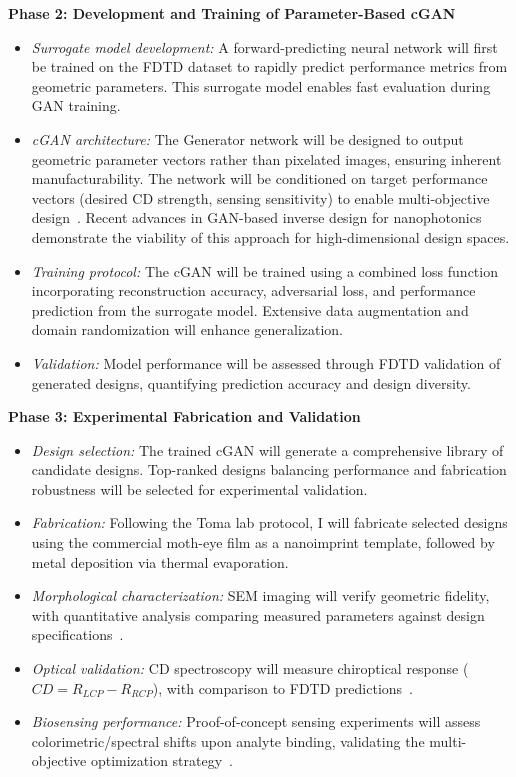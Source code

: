 \documentclass[12pt,a4paper]{article}
\begin{document}
\textbf{Phase 2: Development and Training of Parameter-Based cGAN}

\begin{itemize}
  \item \textit{Surrogate model development:} A forward-predicting neural network will first be trained on the FDTD dataset to rapidly predict performance metrics from geometric parameters. This surrogate model enables fast evaluation during GAN training.
  \item \textit{cGAN architecture:} The Generator network will be designed to output geometric parameter vectors rather than pixelated images, ensuring inherent manufacturability. The network will be conditioned on target performance vectors (desired CD strength, sensing sensitivity) to enable multi-objective design~\cite{benchmark_dl_inverse,conditional_gan_nanophotonics}. Recent advances in GAN-based inverse design for nanophotonics~\cite{rgan_metasurface,gan_nanophotonic_inverse,generative_metasurface_umbc} demonstrate the viability of this approach for high-dimensional design spaces.
  \item \textit{Training protocol:} The cGAN will be trained using a combined loss function incorporating reconstruction accuracy, adversarial loss, and performance prediction from the surrogate model. Extensive data augmentation and domain randomization will enhance generalization.
  \item \textit{Validation:} Model performance will be assessed through FDTD validation of generated designs, quantifying prediction accuracy and design diversity.
\end{itemize}

\textbf{Phase 3: Experimental Fabrication and Validation}

\begin{itemize}
  \item \textit{Design selection:} The trained cGAN will generate a comprehensive library of candidate designs. Top-ranked designs balancing performance and fabrication robustness will be selected for experimental validation.
  \item \textit{Fabrication:} Following the Toma lab protocol, I will fabricate selected designs using the commercial moth-eye film as a nanoimprint template, followed by metal deposition via thermal evaporation.
  \item \textit{Morphological characterization:} SEM imaging will verify geometric fidelity, with quantitative analysis comparing measured parameters against design specifications~\cite{cv_zheng}.
  \item \textit{Optical validation:} CD spectroscopy will measure chiroptical response ($CD = R_{LCP} - R_{RCP}$), with comparison to FDTD predictions~\cite{chiral_metasurface_holography}.
  \item \textit{Biosensing performance:} Proof-of-concept sensing experiments will assess colorimetric/spectral shifts upon analyte binding, validating the multi-objective optimization strategy~\cite{dl_nanophotonics_rg}.
\end{itemize}
\end{document}

